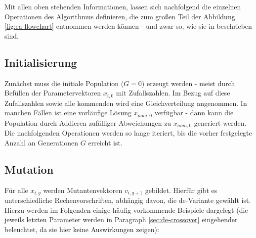 		Mit allen oben stehenden Informationen, lassen sich nachfolgend die 
		einzelnen Operationen des Algorithmus definieren, die zum großen 
		Teil der Abbildung \ref{fig:ea-flowchart} entnommen werden können - und 
		zwar so, wie sie in \cite{storn-price-de, storn-price-de-book} 
		beschrieben sind.
		
		\subsection{Initialisierung}
		\label{sec:de-init}
		
			Zunächst muss die initiale Population ($G = 0$) erzeugt werden - 
			meist durch Befüllen der Parametervektoren $x_{i, 0}$ mit 
			Zufallszahlen. Im Bezug auf diese Zufallszahlen sowie alle 
			kommenden wird eine Gleichverteilung angenommen. In manchen Fällen 
			ist eine vorläufige Lösung $x_{nom, 0}$ verfügbar - dann kann die 
			Population durch Addieren zufälliger Abweichungen zu $x_{nom, 0}$ 
			generiert werden. Die nachfolgenden Operationen werden so lange 
			iteriert, bis die vorher festgelegte Anzahl an Generationen $G$ 
			erreicht ist.
			
		\subsection{Mutation}
		\label{sec:de-mutation}
		
			Für alle $x_{i, g}$ werden Mutantenvektoren $v_{i, g+1}$ gebildet. 
			Hierfür gibt es unterschiedliche Rechenvorschriften, abhängig 
			davon, die \gls{de}-Variante gewählt ist. Hierzu werden im 
			Folgenden einige häufig vorkommende Beispiele dargelegt (die 
			jeweils letzten Parameter werden in Paragraph 
			\ref{sec:de-crossover} eingehender beleuchtet, da sie hier keine 
			Auswirkungen zeigen):
			
